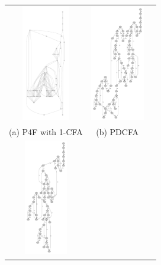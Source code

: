 \documentclass{article}
\begin{document}

\begin{figure}
\small
\begin{tabular}{ccc}
\includegraphics[height=2in]{1p4f.pdf}
&
\includegraphics[height=2in]{pdcfaWOgc.pdf}
\\
(a) P4F with 1-CFA
&
(b) PDCFA
\\
\includegraphics[height=2in]{pdcfa.pdf}

\end{tabular}
\end{figure}
\end{document}
